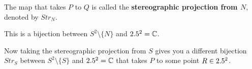 \begin{center}
\end{center}







\begin{definition}
The map that takes $P$ to $Q$ is called the \textbf{stereographic projection from $N$}, denoted by $Str_N$.
\end{definition}


\begin{remark}
This is a bijection between $S^2 \setminus \{ N \}$ and $2.5^2 = \mathbb{C}$.
\end{remark}

Now taking the stereographic projection from $S$ gives you a different bijection $Str_S$ between $S^2 \setminus \{ S \}$ and $2.5^2 = \mathbb{C}$ that takes $P$ to some point $R \in 2.5^2$.


